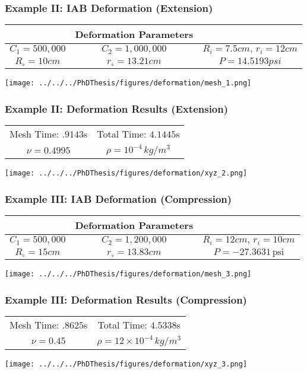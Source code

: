 \begin{frame}
\frametitle{Example II: IAB Deformation (Extension)}
\centering
\begin{tabular}{@{}c@{}c@{}c@{}}
	\toprule
	& Deformation Parameters & \\
	\midrule
	$C_1=500,000$ &  $C_2 = 1,000,000$ & $R_i = 7.5cm, \, r_i = 12cm$ \\
	$R_\circ = 10 cm$ & $r_\circ = 13.21cm$ & $P = 14.5193 psi$  
	\\
	\midrule
	\bottomrule
\end{tabular}
%
\centering
\texttt{[image: ../../../PhDThesis/figures/deformation/mesh\_1.png]}
\centering 
\end{frame}


\begin{frame}
\frametitle{Example II: Deformation Results (Extension)}
\centering
\begin{tabular}{@{}c|@{}|c@{}}
\toprule
\midrule 
Mesh Time: $.9143$s  & Total Time: $4.1445$s \\
%
$\nu=0.4995$ & $\rho = 10^{-4}\,kg/m^3$ 
%
\\
\midrule
\bottomrule
\end{tabular}
\texttt{[image: ../../../PhDThesis/figures/deformation/xyz\_2.png]}
\end{frame}

\begin{frame}
\frametitle{Example III: IAB Deformation (Compression)}
\centering
\begin{tabular}{@{}c@{}c@{}c@{}}
	\toprule
	& Deformation Parameters & \\
	\midrule
	$C_1=500,000$ &  $C_2 = 1,200,000$ & $R_i = 12cm, \, r_i = 10cm$ \\
	$R_\circ = 15 cm$ & $r_\circ = 13.83cm$ & $P = -27.3631 \, \text{psi}$ 
	\\
	\midrule
	\bottomrule
\end{tabular}
%
\centering
\texttt{[image: ../../../PhDThesis/figures/deformation/mesh\_3.png]}
\centering 
\end{frame}


\begin{frame}
\frametitle{Example III: Deformation Results (Compression)}
\centering
\begin{tabular}{@{}c|@{}|c@{}}
\toprule
\midrule 
Mesh Time: $.8625$s  & Total Time: $4.5338$s \\
%
$\nu=0.45$  &  $\rho = 12\times10^{-4}\,kg/m^3$ 
%
\\
\midrule
\bottomrule
\end{tabular}
\texttt{[image: ../../../PhDThesis/figures/deformation/xyz\_3.png]}
\end{frame}

